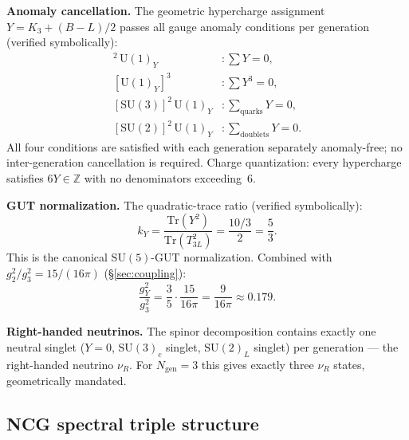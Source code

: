 \documentclass[12pt,a4paper]{article}
\newcommand{\ZZ}{\mathbb{Z}}
\newcommand{\Tr}{\mathrm{Tr}}
\begin{document}
\textbf{Anomaly cancellation.} The geometric hypercharge assignment $Y = K_3 + (B{-}L)/2$
passes all gauge anomaly conditions per generation (verified symbolically):
\begin{align}
  [\mathrm{Grav}]^2\,\mathrm{U}(1)_Y &: \textstyle\sum Y = 0, \\
  [\mathrm{U}(1)_Y]^3 &: \textstyle\sum Y^3 = 0, \\
  [\mathrm{SU}(3)]^2\,\mathrm{U}(1)_Y &: \textstyle\sum_{\text{quarks}} Y = 0, \\
  [\mathrm{SU}(2)]^2\,\mathrm{U}(1)_Y &: \textstyle\sum_{\text{doublets}} Y = 0.
\end{align}
All four conditions are satisfied with each generation separately anomaly-free; no
inter-generation cancellation is required. Charge quantization: every hypercharge
satisfies $6Y\in\ZZ$ with no denominators exceeding~6.

\textbf{GUT normalization.} The quadratic-trace ratio (verified symbolically):
\begin{equation}
  k_Y = \frac{\Tr(Y^2)}{\Tr(T_{3L}^2)} = \frac{10/3}{2} = \frac{5}{3}.
\end{equation}
This is the canonical $\mathrm{SU}(5)$-GUT normalization. Combined with
$g_2^2/g_3^2 = 15/(16\pi)$ (\S\ref{sec:coupling}):
\begin{equation}
  \frac{g_Y^2}{g_3^2} = \frac{3}{5}\cdot\frac{15}{16\pi} = \frac{9}{16\pi} \approx 0.179.
\end{equation}

\textbf{Right-handed neutrinos.} The spinor decomposition contains exactly one neutral
singlet ($Y=0$, $\mathrm{SU}(3)_c$ singlet, $\mathrm{SU}(2)_L$ singlet) per generation ---
the right-handed neutrino $\nu_R$. For $N_{\mathrm{gen}}=3$ this gives exactly three $\nu_R$
states, geometrically mandated.

\subsection{NCG spectral triple structure}
\label{sec:ncg}
\end{document}
